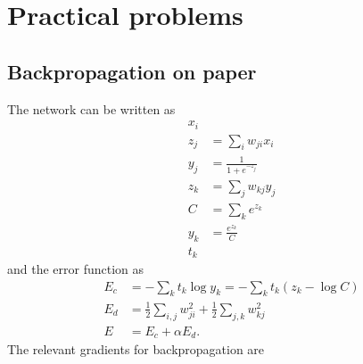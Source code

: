 \documentclass[a4paper,11pt]{article}
\begin{document}
	\section{Practical problems}
	\subsection{Backpropagation on paper}
  The network can be written as
  \begin{align*}
    \tag{input layer}
      x_i\\
    \tag{hidden layer weighting}
      z_j&=\sum_iw_{ji}x_i\\
    \tag{hidden layer activation}
      y_j&=\frac{1}{1+e^{-z_j}}\\
    \tag{output layer weighting}
      z_k&=\sum_jw_{kj}y_j\\
    \tag{output layer normalization}
      C&=\sum_ke^{z_k}\\
    \tag{output layer activation}
      y_k&=\frac{e^{z_k}}{C}\\
    \tag{output target}
      t_k
  \end{align*}
  and the error function as
  \begin{align*}
    \tag{classification error}
      E_c &= -\sum_kt_k\log y_k=-\sum_kt_k(z_k-\log C) \\
    \tag{weight decay error}
      E_d &= \frac{1}{2}\sum_{i,j}w_{ji}^2 + \frac{1}{2}\sum_{j,k}w_{kj}^2\\
    \tag{total error}
      E &= E_c + \alpha E_d.
  \end{align*}
  The relevant gradients for backpropagation are
\end{document}
